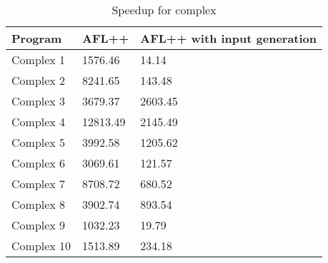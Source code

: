 \begin{table}
\caption{Speedup for complex}
\label{tab:complex_speedup}
\begin{tabular}{lll}
\toprule
Program & AFL++ & AFL++ with input generation \\
\midrule
Complex 1 & 1576.46 & 14.14 \\
Complex 2 & 8241.65 & 143.48 \\
Complex 3 & 3679.37 & 2603.45 \\
Complex 4 & 12813.49 & 2145.49 \\
Complex 5 & 3992.58 & 1205.62 \\
Complex 6 & 3069.61 & 121.57 \\
Complex 7 & 8708.72 & 680.52 \\
Complex 8 & 3902.74 & 893.54 \\
Complex 9 & 1032.23 & 19.79 \\
Complex 10 & 1513.89 & 234.18 \\
\bottomrule
\end{tabular}
\end{table}
